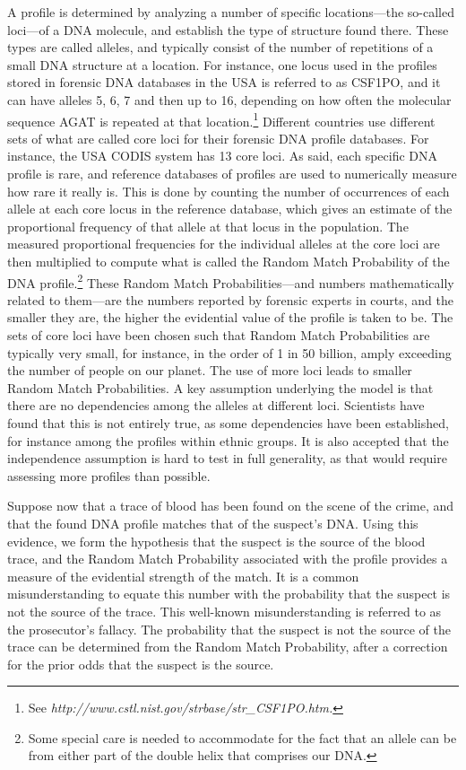 \documentclass[10pt]{article}
\begin{document}
A profile is determined by analyzing a number of specific locations---the so-called loci---of a DNA molecule, and establish the type of structure found there. These types are called alleles, and typically consist of the number of repetitions of a small DNA structure at a location. For instance, one locus used in the profiles stored in forensic DNA databases in the USA is referred to as CSF1PO, and it can have alleles 5, 6, 7 and then up to 16, depending on how often the molecular sequence AGAT is repeated at that location.\footnote{See \textit{http://www.cstl.nist.gov/strbase/str\_CSF1PO.htm.}} Different countries use different sets of what are called core loci for their forensic DNA profile databases. For instance, the USA CODIS system has 13 core loci. As said, each specific DNA profile is rare, and reference databases of profiles are used to numerically measure how rare it really is. This is done by counting the number of occurrences of each allele at each core locus in the reference database, which gives an estimate of the proportional frequency of that allele at that locus in the population. The measured proportional frequencies for the individual alleles at the core loci are then multiplied to compute what is called the Random Match Probability of the DNA profile.\footnote{Some special care is needed to accommodate for the fact that an allele can be from either part of the double helix that comprises our DNA.} These Random Match Probabilities---and numbers mathematically related to them---are the numbers reported by forensic experts in courts, and the smaller they are, the higher the evidential value of the profile is taken to be. The sets of core loci have been chosen such that Random Match Probabilities are typically very small, for instance, in the order of 1 in 50 billion, amply exceeding the number of people on our planet. The use of more loci leads to smaller Random Match Probabilities. A key assumption underlying the model is that there are no dependencies among the alleles at different loci. Scientists have found that this is not entirely true, as some dependencies have been established, for instance among the profiles within ethnic groups. It is also accepted that the independence assumption is hard to test in full generality, as that would require assessing more profiles than possible.

Suppose now that a trace of blood has been found on the scene of the crime, and that the found DNA profile matches that of the suspect's DNA. Using this evidence, we form the hypothesis that the suspect is the source of the blood trace, and the Random Match Probability associated with the profile provides a measure of the evidential strength of the match. It is a common misunderstanding to equate this number with the probability that the suspect is not the source of the trace. This well-known misunderstanding is referred to as the prosecutor's fallacy. The probability that the suspect is not the source of the trace can be determined from the Random Match Probability, after a correction for the prior odds that the suspect is the source.
\end{document}
